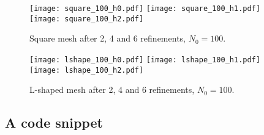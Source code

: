 \begin{figure}[!ht]
	\centering
	\texttt{[image: square\_100\_h0.pdf]}
    \texttt{[image: square\_100\_h1.pdf]}
    \texttt{[image: square\_100\_h2.pdf]}
	\caption{Square mesh after 2, 4 and 6 refinements, $N_0 = 100$.}
\end{figure}

\begin{figure}[!ht]
	\centering
	\texttt{[image: lshape\_100\_h0.pdf]}
    \texttt{[image: lshape\_100\_h1.pdf]}
    \texttt{[image: lshape\_100\_h2.pdf]}
	\caption{L-shaped mesh after 2, 4 and 6 refinements, $N_0 = 100$.}
\end{figure}

\newpage
\subsection{A code snippet}


